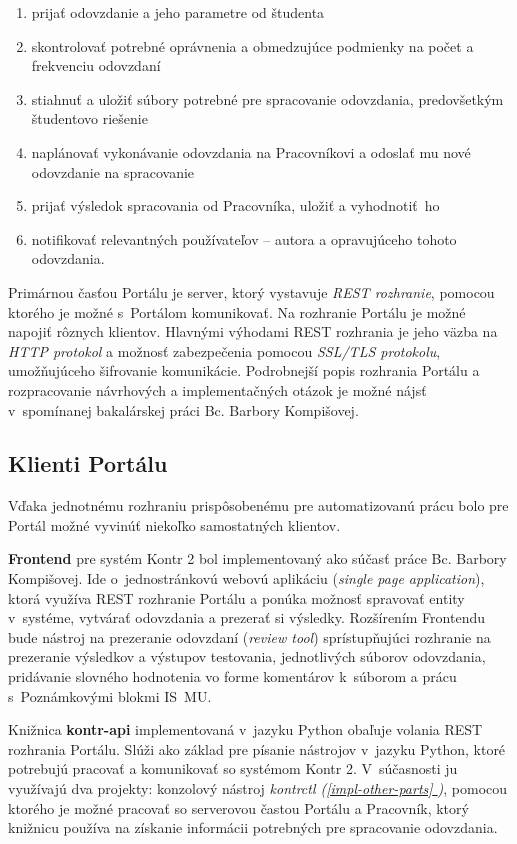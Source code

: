 \documentclass[
  digital, %
  oneside, %
  table,   %
  lof,     %
  lot,   %
]{fithesis3}
\newcommand*{\fullref}[1]{\hyperref[{#1}]{\ref*{#1} \nameref*{#1}}}
\begin{document}
\begin{enumerate}
  \item prijať odovzdanie a jeho parametre od študenta
  \item skontrolovať potrebné oprávnenia a obmedzujúce podmienky na počet a frekvenciu odovzdaní
  \item stiahnuť a uložiť súbory potrebné pre spracovanie odovzdania, predovšetkým študentovo riešenie
  \item naplánovať vykonávanie odovzdania na Pracovníkovi a odoslať mu nové odovzdanie na spracovanie
  \item prijať výsledok spracovania od Pracovníka, uložiť a vyhodnotiť~ho
  \item notifikovať relevantných používateľov -- autora a opravujúceho tohoto odovzdania.
\end{enumerate}

Primárnou časťou Portálu je server, ktorý vystavuje \emph{REST rozhranie}\cite{fielding}, pomocou ktorého je možné s~Portálom komunikovať. Na rozhranie Portálu je možné napojiť rôznych klientov. Hlavnými výhodami REST rozhrania je jeho väzba na \emph{HTTP protokol}\cite{RFC2616} a možnosť zabezpečenia pomocou \emph{SSL/TLS protokolu}\cite{RFC8446}, umožňujúceho šifrovanie komunikácie. Podrobnejší popis rozhrania Portálu a rozpracovanie návrhových a implementačných otázok je možné nájsť v~spomínanej bakalárskej práci Bc. Barbory Kompišovej\cite{kontr-portal}.

\subsection{Klienti Portálu}
Vďaka jednotnému rozhraniu prispôsobenému pre automatizovanú prácu bolo pre Portál možné vyvinúť niekoľko samostatných klientov. 

\textbf{Frontend} pre systém Kontr 2 bol implementovaný ako súčasť práce Bc. Barbory Kompišovej\cite{kontr-portal}. Ide o~jednostránkovú webovú aplikáciu (\emph{single page application})\cite{single-page-app}, ktorá využíva REST rozhranie Portálu a ponúka možnosť spravovať entity v~systéme, vytvárať odovzdania a prezerať si výsledky. Rozšírením Frontendu bude nástroj na prezeranie odovzdaní (\emph{review tool}) sprístupňujúci rozhranie na prezeranie výsledkov a výstupov testovania, jednotlivých súborov odovzdania, pridávanie slovného hodnotenia vo forme komentárov k~súborom a prácu s~Poznámkovými blokmi IS~MU. 

Knižnica \textbf{kontr-api} implementovaná v~jazyku Python obaľuje volania REST rozhrania Portálu. Slúži ako základ pre písanie nástrojov v~jazyku Python, ktoré potrebujú pracovať a komunikovať so systémom Kontr 2. V~súčasnosti ju využívajú dva projekty: konzolový nástroj \emph{kontrctl (\fullref{impl-other-parts})}, pomocou ktorého je možné pracovať so serverovou častou Portálu a Pracovník, ktorý knižnicu používa na získanie informácii potrebných pre spracovanie odovzdania.
\end{document}
